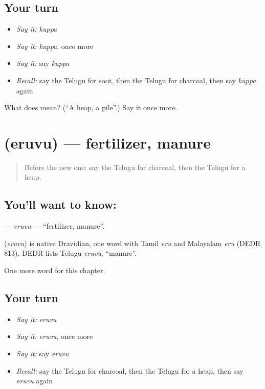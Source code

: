 \subsection*{Your turn}
\begin{itemize}
\raggedright
  \item \emph{Say it:} \emph{kuppa}
  \item \emph{Say it:} \emph{kuppa}, once more
  \item \emph{Say it:} say \emph{kuppa}
  \item \emph{Recall:} say the Telugu for soot, then the Telugu for charcoal, then say \emph{kuppa} again
\end{itemize}

\begin{tcolorbox}[breakable,colback=teal!4,colframe=teal!35!black,title={Before you move on}]
What does  mean? (\textquotedblleft{}A heap, a pile\textquotedblright{}.) Say it once more.
\end{tcolorbox}
\section[\texorpdfstring{\te{ఎరువు} (eruvu)}{ఎరువు (eruvu)}]{ (eruvu) — fertilizer, manure}

\label{lesson:TE-C234-eruvu}



\begin{quote}
Before the new one: say the Telugu for charcoal, then the Telugu for a heap.
\end{quote}

\subsection*{You'll want to know: }
\textbf{} — \emph{eruvu} — \textquotedblleft{}fertilizer, manure\textquotedblright{}.

\begin{cousinweb}
\textbf{} (\emph{eruvu}) is native Dravidian, one word with Tamil \emph{eru} and Malayalam \emph{eru} (DEDR 813). DEDR lists Telugu \emph{eruvu}, \textquotedblleft{}manure\textquotedblright{}.
\end{cousinweb}

\begin{grammarlens}[title={What you've built}]
One more word for this chapter.
\end{grammarlens}

\subsection*{Your turn}
\begin{itemize}
\raggedright
  \item \emph{Say it:} \emph{eruvu}
  \item \emph{Say it:} \emph{eruvu}, once more
  \item \emph{Say it:} say \emph{eruvu}
  \item \emph{Recall:} say the Telugu for charcoal, then the Telugu for a heap, then say \emph{eruvu} again
\end{itemize}

